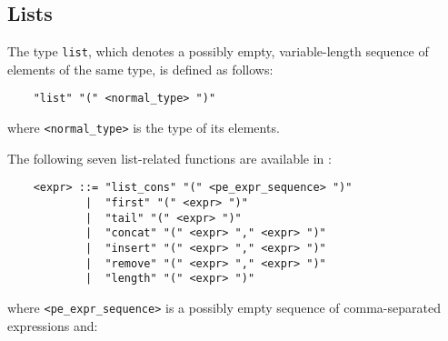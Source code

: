 \subsection{Lists}

The type {\tt list}, which denotes a possibly empty, variable-length sequence of elements of the same type,
is defined as follows:

	\begin{verbatim}
    "list" "(" <normal_type> ")"
	\end{verbatim}

\noindent where {\tt <normal\_type>} is the type of its elements.

The following seven list-related functions are available in \aemilia:

	\begin{verbatim}
    <expr> ::= "list_cons" "(" <pe_expr_sequence> ")"
            |  "first" "(" <expr> ")"
            |  "tail" "(" <expr> ")"
            |  "concat" "(" <expr> "," <expr> ")"
            |  "insert" "(" <expr> "," <expr> ")"
            |  "remove" "(" <expr> "," <expr> ")"
            |  "length" "(" <expr> ")"
	\end{verbatim}

\noindent where {\tt <pe\_expr\_sequence>} is a possibly empty sequence of comma-separated expressions and:

